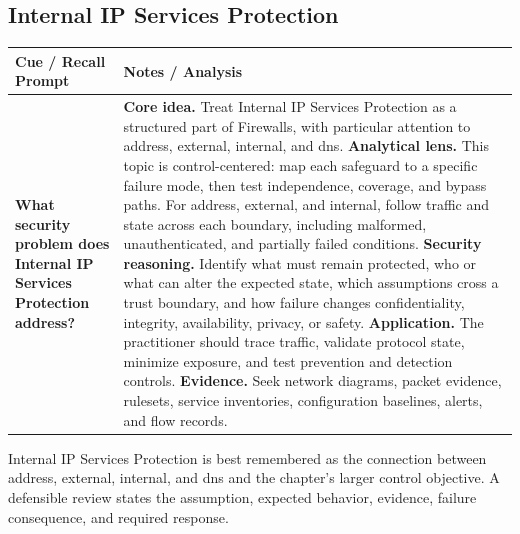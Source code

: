 \documentclass[11pt]{article}
\newcommand{\CornellHeader}{%
\rowcolor{Navy}\color{white}\bfseries Cue / Recall Prompt & \color{white}\bfseries Notes / Analysis\\\hline}
\newcommand{\CornellRow}[2]{%
\cellcolor{CueGray}\RaggedRight\textbf{#1} & \RaggedRight #2\\\hline}
\begin{document}
\subsection*{Internal IP Services Protection}
\begin{longtable}{>{\RaggedRight\arraybackslash}p{}|>{\RaggedRight\arraybackslash}p{}}
\CornellHeader
\CornellRow{What security problem does Internal IP Services Protection address?}{\textbf{Core idea.} Treat Internal IP Services Protection as a structured part of Firewalls, with particular attention to address, external, internal, and dns. \textbf{Analytical lens.} This topic is control-centered: map each safeguard to a specific failure mode, then test independence, coverage, and bypass paths. For address, external, and internal, follow traffic and state across each boundary, including malformed, unauthenticated, and partially failed conditions. \textbf{Security reasoning.} Identify what must remain protected, who or what can alter the expected state, which assumptions cross a trust boundary, and how failure changes confidentiality, integrity, availability, privacy, or safety. \textbf{Application.} The practitioner should trace traffic, validate protocol state, minimize exposure, and test prevention and detection controls. \textbf{Evidence.} Seek network diagrams, packet evidence, rulesets, service inventories, configuration baselines, alerts, and flow records.}
\end{longtable}
\begin{topicsummary}
Internal IP Services Protection is best remembered as the connection between address, external, internal, and dns and the chapter's larger control objective. A defensible review states the assumption, expected behavior, evidence, failure consequence, and required response.
\end{topicsummary}
\end{document}
